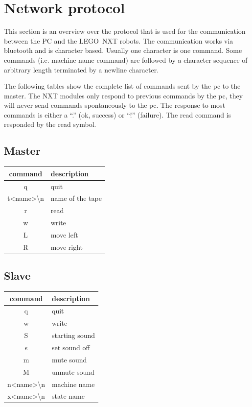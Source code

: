 \documentclass[%
  a4paper,%
  11pt,%
  blue,%
  hyperref	%
  ]{tubsartcl}
\begin{document}
\section{Network protocol}

This section is an overview over the protocol that is used for the communication between the PC and the LEGO\textregistered\, NXT robots. The communication works via bluetooth and is character based. Usually one character is one command. Some commands (i.e. machine name command) are followed by a character sequence of arbitrary length terminated by a newline character.

The following tables show the complete list of commands sent by the pc to the master. The NXT modules only respond to previous commands by the pc, they will never send commands spontaneously to the pc. The response to most commands is either a ``.'' (ok, success) or ``!'' (failure). The read command is responded by the read symbol.

\begin{minipage}{5cm}
\subsection{Master}
\begin{tabular}{c|l}
command & description\\
\hline
q & quit\\
t<name>\textbackslash n & name of the tape\\
r & read\\
w & write\\
L & move left\\
R & move right
\end{tabular}
\vspace{1cm}
\end{minipage}
\hspace{2cm}
\begin{minipage}{5cm}
\subsection{Slave}
\begin{tabular}{c|l}
command & description\\
\hline
q & quit\\
w & write\\
S & starting sound\\
s & set sound off\\
m & mute sound\\
M & unmute sound\\
n<name>\textbackslash n & machine name\\
x<name>\textbackslash n & state name
\end{tabular}
\end{minipage}

\makebackpage[trisec]%
\end{document}
